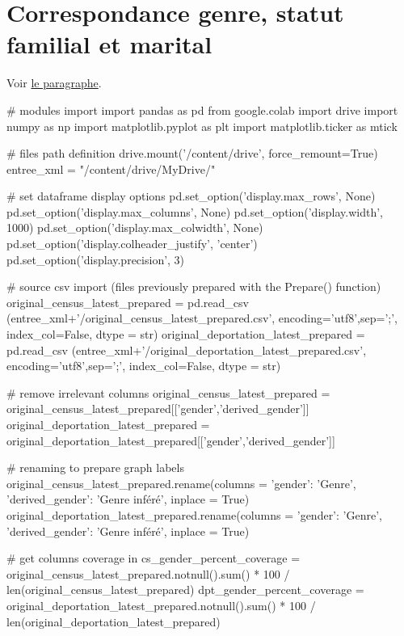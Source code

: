 \documentclass[a4paper,12pt,twoside]{book}
\begin{document}

		    \pagebreak
		    
        \section{Correspondance genre, statut familial et marital}
		
		    Voir \hyperref[fig16]{le paragraphe}.
		    \label{analyse5}
		
		    \begin{python}
# modules import
import pandas as pd
from google.colab import drive
import numpy as np
import matplotlib.pyplot as plt
import matplotlib.ticker as mtick

# files path definition
drive.mount('/content/drive', force_remount=True)
entree_xml = "/content/drive/MyDrive/"

# set dataframe display options
pd.set_option('display.max_rows', None)
pd.set_option('display.max_columns', None)
pd.set_option('display.width', 1000)
pd.set_option('display.max_colwidth', None)
pd.set_option('display.colheader_justify', 'center')
pd.set_option('display.precision', 3)

# source csv import (files previously prepared with the Prepare() function)
original_census_latest_prepared = pd.read_csv (entree_xml+'/original_census_latest_prepared.csv', encoding='utf8',sep=';', index_col=False, dtype = str)
original_deportation_latest_prepared = pd.read_csv (entree_xml+'/original_deportation_latest_prepared.csv', encoding='utf8',sep=';', index_col=False, dtype = str)

# remove irrelevant columns
original_census_latest_prepared = original_census_latest_prepared[['gender','derived_gender']]
original_deportation_latest_prepared = original_deportation_latest_prepared[['gender','derived_gender']]

# renaming to prepare graph labels
original_census_latest_prepared.rename(columns = {'gender': 'Genre', 'derived_gender': 'Genre inféré'}, inplace = True)
original_deportation_latest_prepared.rename(columns = {'gender': 'Genre', 'derived_gender': 'Genre inféré'}, inplace = True)

# get columns coverage in %
cs_gender_percent_coverage = original_census_latest_prepared.notnull().sum() * 100 / len(original_census_latest_prepared)
dpt_gender_percent_coverage = original_deportation_latest_prepared.notnull().sum() * 100 / len(original_deportation_latest_prepared)


\end{python}
\end{document}
